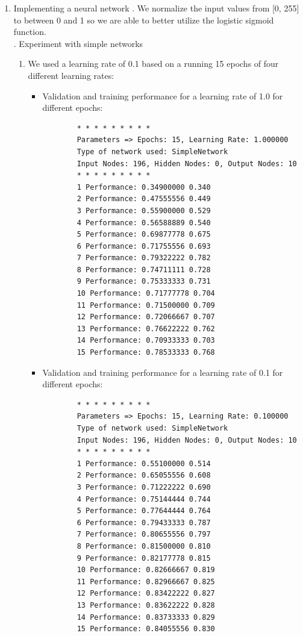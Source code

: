 \documentclass[11pt]{article}
\begin{document}
\begin{enumerate}
\begin{enumerate}
	\end{enumerate}
\item Implementing a neural network
\newline
{}. We normalize the input values from [0, 255] to between 0 and 1 so we are able to better utilize the logistic sigmoid function.\\ 
. Experiment with simple networks
\begin{enumerate}
\item We used a learning rate of 0.1 based on a running 15 epochs of four different learning rates:
	\begin{itemize}
	\item Validation and training performance for a learning rate of 1.0 for different epochs:
		\begin{verbatim}
		* * * * * * * * *
		Parameters => Epochs: 15, Learning Rate: 1.000000
		Type of network used: SimpleNetwork
		Input Nodes: 196, Hidden Nodes: 0, Output Nodes: 10
		* * * * * * * * *
		1 Performance: 0.34900000 0.340
		2 Performance: 0.47555556 0.449
		3 Performance: 0.55900000 0.529
		4 Performance: 0.56588889 0.540
		5 Performance: 0.69877778 0.675
		6 Performance: 0.71755556 0.693
		7 Performance: 0.79322222 0.782
		8 Performance: 0.74711111 0.728
		9 Performance: 0.75333333 0.731
		10 Performance: 0.71777778 0.704
		11 Performance: 0.71500000 0.709
		12 Performance: 0.72066667 0.707
		13 Performance: 0.76622222 0.762
		14 Performance: 0.70933333 0.703
		15 Performance: 0.78533333 0.768
		\end{verbatim}
	\item Validation and training performance for a learning rate of 0.1 for different epochs:
		\begin{verbatim}
		* * * * * * * * *
		Parameters => Epochs: 15, Learning Rate: 0.100000
		Type of network used: SimpleNetwork
		Input Nodes: 196, Hidden Nodes: 0, Output Nodes: 10
		* * * * * * * * *
		1 Performance: 0.55100000 0.514
		2 Performance: 0.65055556 0.608
		3 Performance: 0.71222222 0.690
		4 Performance: 0.75144444 0.744
		5 Performance: 0.77644444 0.764
		6 Performance: 0.79433333 0.787
		7 Performance: 0.80655556 0.797
		8 Performance: 0.81500000 0.810
		9 Performance: 0.82177778 0.815
		10 Performance: 0.82666667 0.819
		11 Performance: 0.82966667 0.825
		12 Performance: 0.83422222 0.827
		13 Performance: 0.83622222 0.828
		14 Performance: 0.83733333 0.829
		15 Performance: 0.84055556 0.830
		\end{verbatim}

\end{itemize}
\end{enumerate}
\end{enumerate}
\end{document}
